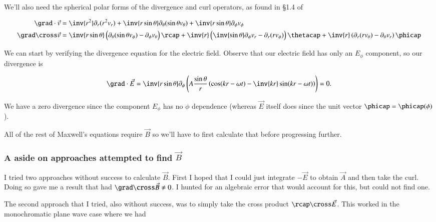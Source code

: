 We'll also need the spherical polar forms of the divergence and curl operators, as found in \S 1.4 of \citep{griffith1981introduction}

\begin{align}\label{eqn:relElectroDynProblemSet4:440}
\grad \cdot \vec{v} &=
\inv{r^2} \partial_r ( r^2 v_r )
+ \inv{r\sin\theta} \partial_\theta (\sin\theta v_\theta)
+ \inv{r\sin\theta} \partial_\phi v_\phi \\
\grad \cross \vec{v} &=
\inv{r \sin\theta} \left(
\partial_\theta (\sin\theta v_\phi) - \partial_\phi v_\theta
\right) \rcap
+
\inv{r } \left(
\inv{\sin\theta} \partial_\phi v_r - \partial_r (r v_\phi)
\right) \thetacap
+
\inv{r } \left(
\partial_r (r v_\theta) - \partial_\theta v_r
\right) \phicap
\end{align}

We can start by verifying the divergence equation for the electric field.  Observe that our electric field has only an $E_\phi$ component, so our divergence is

\begin{equation}\label{eqn:relElectroDynProblemSet4:460}
\grad \cdot \vec{E}
=
\inv{r\sin\theta} \partial_\phi \left(
A \frac{\sin\theta}{r} \left( \cos(k r - \omega t) - \inv{k r} \sin(k r - \omega t) \right) \right) = 0.
\end{equation}

We have a zero divergence since the component $E_\phi$ has no $\phi$ dependence (whereas $\vec{E}$ itself does since the unit vector $\phicap = \phicap(\phi)$).

All of the rest of Maxwell's equations require $\vec{B}$ so we'll have to first calculate that before progressing further.

\subsubsection{A aside on approaches attempted to find $\vec{B}$}

I tried two approaches without success to calculate $\vec{B}$.  First I hoped that I could just integrate $-\vec{E}$ to obtain $\vec{A}$ and then take the curl.  Doing so gave me a result that had $\grad \cross \vec{B} \ne 0$.  I hunted for an algebraic error that would account for this, but could not find one.

The second approach that I tried, also without success, was to simply take the cross product $\rcap \cross \vec{E}$.  This worked in the monochromatic plane wave case where we had

